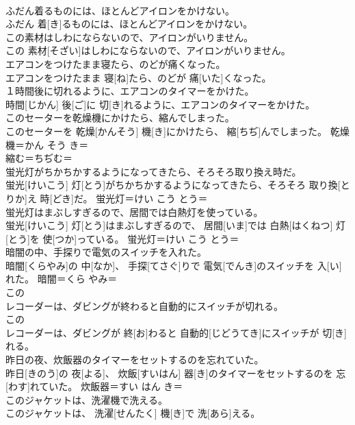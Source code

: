 \documentclass[8pt]{extreport}
\begin{document}
\begin{CJK}{UTF8}{min}
\\	ふだん着るものには、ほとんどアイロンをかけない。	
\\	ふだん 着[き]るものには、ほとんどアイロンをかけない。	
\\	この素材はしわにならないので、アイロンがいりません。	
\\	この 素材[そざい]はしわにならないので、アイロンがいりません。	
\\	エアコンをつけたまま寝たら、のどが痛くなった。	
\\	エアコンをつけたまま 寝[ね]たら、のどが 痛[いた]くなった。	
\\	１時間後に切れるように、エアコンのタイマーをかけた。	
\\	時間[じかん] 後[ご]に 切[き]れるように、エアコンのタイマーをかけた。	
\\	このセーターを乾燥機にかけたら、縮んでしまった。	
\\	このセーターを 乾燥[かんそう] 機[き]にかけたら、 縮[ちぢ]んでしまった。	乾燥機＝かん そう き＝ 
\\	縮む＝ちぢむ＝ 
\\	蛍光灯がちかちかするようになってきたら、そろそろ取り換え時だ。	
\\	蛍光[けいこう] 灯[とう]がちかちかするようになってきたら、そろそろ 取り換[とりか]え 時[どき]だ。	蛍光灯＝けい こう とう＝ 
\\	蛍光灯はまぶしすぎるので、居間では白熱灯を使っている。	
\\	蛍光[けいこう] 灯[とう]はまぶしすぎるので、 居間[いま]では 白熱[はくねつ] 灯[とう]を 使[つか]っている。	蛍光灯＝けい こう とう＝ 
\\	暗闇の中、手探りで電気のスイッチを入れた。	
\\	暗闇[くらやみ]の 中[なか]、 手探[てさぐ]りで 電気[でんき]のスイッチを 入[い]れた。	暗闇＝くら やみ＝ 
\\	この
\\	レコーダーは、ダビングが終わると自動的にスイッチが切れる。	
\\	この 
\\	レコーダーは、ダビングが 終[お]わると 自動的[じどうてき]にスイッチが 切[き]れる。	
\\	昨日の夜、炊飯器のタイマーをセットするのを忘れていた。	
\\	昨日[きのう]の 夜[よる]、 炊飯[すいはん] 器[き]のタイマーをセットするのを 忘[わす]れていた。	炊飯器＝すい はん き＝ 
\\	このジャケットは、洗濯機で洗える。	
\\	このジャケットは、 洗濯[せんたく] 機[き]で 洗[あら]える。	

\end{CJK}
\end{document}
